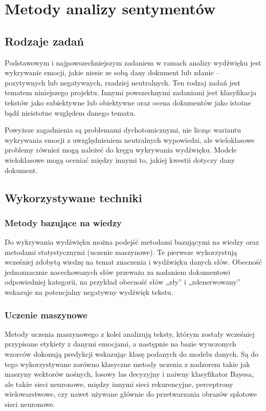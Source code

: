 \newpage
\section{Metody analizy sentymentów}
\subsection{Rodzaje zadań}
Podstawowym i najpowszechniejszym zadaniem w ramach analizy wydźwięku jest wykrywanie emocji, jakie niesie ze sobą dany dokument lub zdanie -- pozytywnych lub negatywnych, rzadziej neutralnych. Ten rodzaj
zadań jest tematem niniejszego projektu.
Innymi powszechnymi zadaniami jest klasyfikacja tekstów jako subiektywne lub obiektywne oraz
ocena dokumentów jako istotne bądź nieistotne względem danego tematu.

Powyższe zagadnienia są problemami dychotomicznymi, nie licząc wariantu wykrywania emocji
z uwzględnieniem neutralnych wypowiedzi, ale wieloklasowe problemy również mogą należeć
do kręgu wykrywania wydźwięku. Modele wieloklasowe mogą oceniać między innymi to, jakiej
kwestii dotyczy dany dokument.

\subsection{Wykorzystywane techniki}
\subsubsection{Metody bazujące na wiedzy}
Do wykrywania wydźwięku można podejść metodami bazującymi na wiedzy oraz metodami statystycznymi (uczenie maszynowe).
Te pierwsze wykorzystują wcześniej zdobytą wiedzę na temat znaczenia i wydźwięku danych słów.
Obecność jednoznacznie nacechowanych słów przeważa za nadaniem dokumentowi odpowiedniej
kategorii, na przykład obecność słów „zły” i „zdenerwowany” wskazuje na potencjalny
negatywny wydźwięk tekstu.

\subsubsection{Uczenie maszynowe}
Metody uczenia maszynowego z kolei analizują teksty, którym zostały wcześniej przypisane etykiety
z danymi emocjami, a następnie na bazie wyuczonych wzorców dokonują predykcji wskazując
klasę podanych do modelu danych. Są do tego wykorzystywane zarówno klasyczne metody
uczenia z nadzorem takie jak maszyny wektorów nośnych, losowy las decyzyjny i naiwny 
klasyfikator Bayesa, ale także sieci neuronowe, między innymi sieci rekurencyjne,
perceptrony wielowarstwowe, czy nawet używane głównie do przetwarzania obrazów splotowe
sieci neuronowe.

